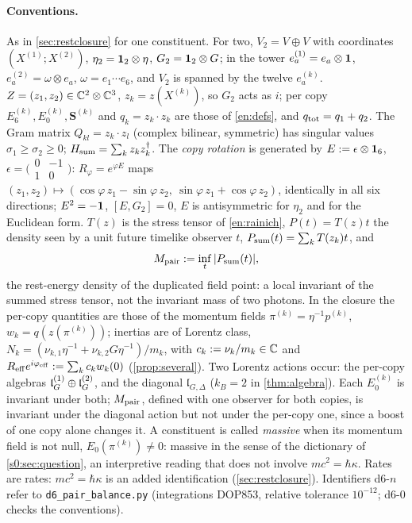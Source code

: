 \paragraph{Conventions.} As in \cref{sec:restclosure} for one constituent. For two, $V_2=V\oplus V$ with coordinates $(X^{(1)};X^{(2)})$,
$\eta_2=\mathbf 1_2\otimes\eta$, $G_2=\mathbf 1_2\otimes G$; in the tower $e^{(1)}_a=e_a\otimes\mathbf 1$, $e^{(2)}_a=\omega\otimes e_a$, $\omega=e_1\cdots e_6$,
and $V_2$ is spanned by the twelve $e^{(k)}_a$. $Z=(z_1,z_2)\in\mathbb{C}^2\otimes\mathbb{C}^3$, $z_k=z(X^{(k)})$, so $G_2$ acts as $i$; per copy
$E_6^{(k)},E_0^{(k)},\mathbf S^{(k)}$ and $q_k=z_k\cdot z_k$ are those of \eqref{en:defs}, and $q_{\rm tot}=q_1+q_2$. The Gram matrix
$Q_{kl}=z_k\cdot z_l$ (complex bilinear, symmetric) has singular values $\sigma_1\ge\sigma_2\ge0$; $H_{\rm sum}=\sum_kz_kz_k^\dagger$. The
\emph{copy rotation} is generated by $E:=\epsilon\otimes\mathbf 1_6$, $\epsilon=\bigl(\begin{smallmatrix}0&-1\\1&0\end{smallmatrix}\bigr)$:
$R_\varphi=e^{\varphi E}$ maps $(z_1,z_2)\mapsto(\cos\varphi\,z_1-\sin\varphi\,z_2,\ \sin\varphi\,z_1+\cos\varphi\,z_2)$, identically in all six
directions; $E^2=-\mathbf 1$, $[E,G_2]=0$, $E$ is antisymmetric for $\eta_2$ and for the Euclidean form. $T(z)$ is the stress tensor of
\cref{en:rainich}, $P(t)=T(z)t$ the density seen by a unit future timelike observer $t$, $P_{\rm sum}(t)=\sum_kT(z_k)t$, and
\[
M_{\rm pair}:=\inf_t|P_{\rm sum}(t)|,
\]
the rest-energy density of the duplicated field point: a local invariant of the summed stress tensor, not the invariant mass of two photons. In the closure the per-copy quantities are those of the momentum fields
$\pi^{(k)}=\eta^{-1}p^{(k)}$, $w_k=q(z(\pi^{(k)}))$; inertias are of Lorentz class, $N_k=(\nu_{k,1}\eta^{-1}+\nu_{k,2}G\eta^{-1})/m_k$, with
$c_k:=\nu_k/m_k\in\mathbb{C}$ and $R_{\rm eff}e^{i\varphi_{\rm eff}}:=\sum_kc_kw_k(0)$ (\cref{prop:several}). Two Lorentz actions occur: the
per-copy algebras $\mathfrak l_G^{(1)}\oplus\mathfrak l_G^{(2)}$, and the diagonal $\mathfrak l_{G,\Delta}$ ($k_B=2$ in \cref{thm:algebra}). Each $E_0^{(k)}$ is invariant under both; $M_{\rm pair}$, defined with one observer for both copies, is invariant under the diagonal action but not under the per-copy one, since a boost of one copy alone changes it. A constituent is called \emph{massive} when its momentum field is not null, $E_0(\pi^{(k)})\neq0$:
massive in the sense of the dictionary of \cref{s0:sec:question}, an interpretive reading that does not involve $mc^2=\hbar\kappa$. Rates are rates:
$mc^2=\hbar\kappa$ is an added identification (\cref{sec:restclosure}). Identifiers d6-$n$ refer to \texttt{d6\_pair\_balance.py}
(integrations DOP853, relative tolerance $10^{-12}$; d6-0 checks the conventions).

